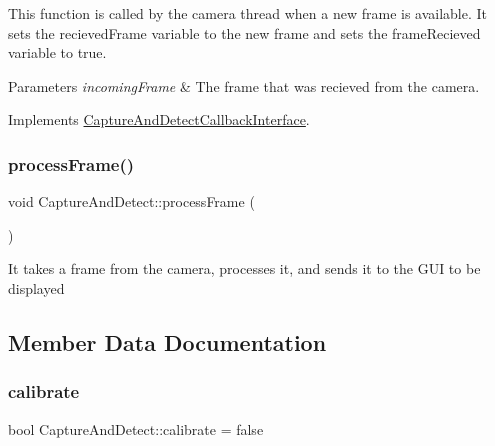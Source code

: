 This function is called by the camera thread when a new frame is available. It sets the recieved\+Frame variable to the new frame and sets the frame\+Recieved variable to true.


\begin{DoxyParams}{Parameters}
{\em incoming\+Frame} & The frame that was recieved from the camera. \\
\hline
\end{DoxyParams}


Implements \hyperlink{classCaptureAndDetectCallbackInterface_ae833754fc1c2bb1450e958ef619e9153}{Capture\+And\+Detect\+Callback\+Interface}.

\mbox{\label{classCaptureAndDetect_ac7e70bbcade4e0023541c556ee7cb34e}} 
\subsubsection{\texorpdfstring{process\+Frame()}{processFrame()}}
{\footnotesize\ttfamily void Capture\+And\+Detect\+::process\+Frame (\begin{DoxyParamCaption}{ }\end{DoxyParamCaption})}

It takes a frame from the camera, processes it, and sends it to the G\+UI to be displayed 

\subsection{Member Data Documentation}
\mbox{\label{classCaptureAndDetect_ae57b827ebac2b4d5f5baaa8935442183}} 
\subsubsection{\texorpdfstring{calibrate}{calibrate}}
{\footnotesize\ttfamily bool Capture\+And\+Detect\+::calibrate = false}

\mbox{\label{classCaptureAndDetect_ad614571fedee59ecccccf0c14c3dd542}} 
